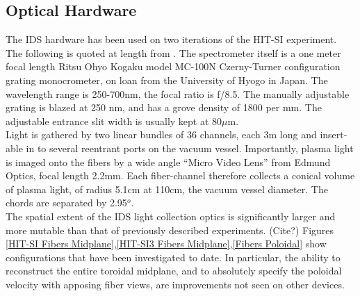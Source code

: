 \documentclass{AIAA}
\begin{document}
\subsection{Optical Hardware}
\hspace{4ex}The IDS hardware has been used on two iterations of the HIT-SI experiment. The following is quoted at length from \cite{hossack2015study}. The spectrometer itself is a one meter focal length Ritsu Ohyo Kogaku model MC-100N Czerny-Turner configuration grating monocrometer, on loan from the University of Hyogo in Japan. The wavelength range is 250-700nm, the focal ratio is f/8.5. The manually adjustable grating is blazed at 250 nm, and has a grove density of 1800 per mm. The adjustable entrance slit width is usually kept at 80$\mu$m.\\
\hspace*{4ex}Light is gathered by two linear bundles of 36 channels, each 3m long and insert-able in to several reentrant ports on the vacuum vessel. Importantly, plasma light is imaged onto the fibers by a wide angle ``Micro Video Lens'' from Edmund Optics, focal length 2.2mm. Each fiber-channel therefore collects a conical volume of plasma light, of radius 5.1cm at 110cm, the vacuum vessel diameter. The chords are separated by 2.95$^o$.\\
\hspace*{4ex}The spatial extent of the IDS light collection optics is significantly larger and more mutable than that of previously described experiments. (Cite?) Figures \ref{HIT-SI Fibers Midplane},\ref{HIT-SI3 Fibers Midplane},\ref{Fibers Poloidal} show configurations that have been investigated to date. In particular, the ability to reconstruct the entire toroidal midplane, and to absolutely specify the poloidal velocity with apposing fiber views, are improvements not seen on other devices.
\end{document}
